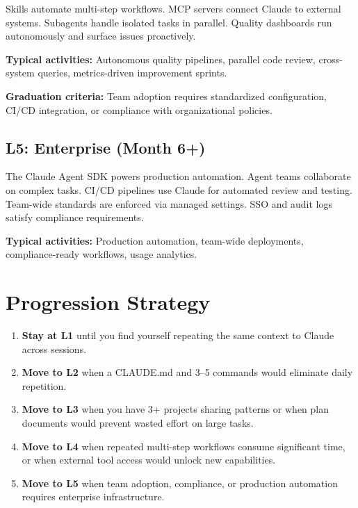 Skills automate multi-step workflows. MCP servers connect Claude to external
systems. Subagents handle isolated tasks in parallel. Quality dashboards
run autonomously and surface issues proactively.

\textbf{Typical activities:} Autonomous quality pipelines, parallel code review,
cross-system queries, metrics-driven improvement sprints.

\textbf{Graduation criteria:} Team adoption requires standardized configuration,
CI/CD integration, or compliance with organizational policies.

\subsection{L5: Enterprise (Month 6+)}

The Claude Agent SDK powers production automation.
Agent teams collaborate on complex tasks.
CI/CD pipelines use Claude for automated review and testing.
Team-wide standards are enforced via managed settings.
SSO and audit logs satisfy compliance requirements.

\textbf{Typical activities:} Production automation, team-wide deployments,
compliance-ready workflows, usage analytics.

\section{Progression Strategy}
\label{sec:progression}


\begin{enumerate}
  \item \textbf{Stay at L1} until you find yourself repeating the same
    context to Claude across sessions.
  \item \textbf{Move to L2} when a CLAUDE.md and 3--5 commands would
    eliminate daily repetition.
  \item \textbf{Move to L3} when you have 3+ projects sharing patterns
    or when plan documents would prevent wasted effort on large tasks.
  \item \textbf{Move to L4} when repeated multi-step workflows consume
    significant time, or when external tool access would unlock new capabilities.
  \item \textbf{Move to L5} when team adoption, compliance, or production
    automation requires enterprise infrastructure.
\end{enumerate}

